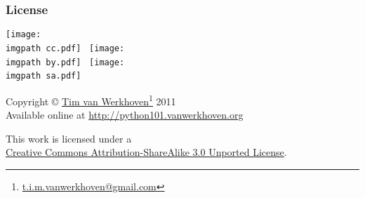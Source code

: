 \documentclass[xetex,10pt]{beamer}
\def\imgpath{../00-img/}
\def\spacer{\vspace*{1em}}
\begin{document}
\begin{frame}
	\frametitle{License}

	\begin{center}
	\texttt{[image: \\imgpath cc.pdf]}~
	\texttt{[image: \\imgpath by.pdf]}~
	\texttt{[image: \\imgpath sa.pdf]}~
	
	\spacer

	Copyright © \href{http://work.vanwerkhoven.org/}{Tim van Werkhoven}\footnote[frame]{\url{t.i.m.vanwerkhoven@gmail.com}} 2011\\
	Available online at \url{http://python101.vanwerkhoven.org}
	
	\spacer

	This work is licensed under a\\
	\href{http://creativecommons.org/licenses/by-sa/3.0/}{Creative Commons Attribution-ShareAlike 3.0 Unported License}.

	\end{center}
	
\end{frame}
\end{document}
